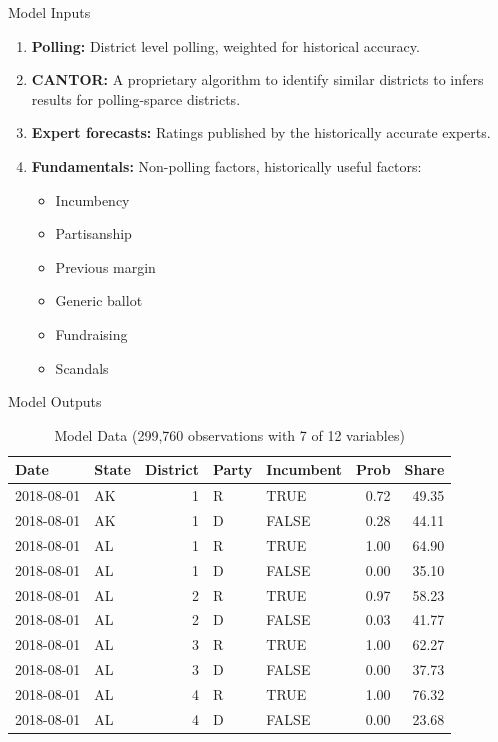 \documentclass[
  ignorenonframetext,
]{beamer}
\providecommand{\tightlist}{%
  \setlength{\itemsep}{0pt}\setlength{\parskip}{0pt}}
\begin{document}
\begin{frame}{Model Inputs}
\protect\hypertarget{model-inputs}{}

\begin{enumerate}
\tightlist
\item
  \textbf{Polling:} District level polling, weighted for historical
  accuracy.
\item
  \textbf{CANTOR:} A proprietary algorithm to identify similar districts
  to infers results for polling-sparce districts.
\item
  \textbf{Expert forecasts:} Ratings published by the historically
  accurate experts.
\item
  \textbf{Fundamentals:} Non-polling factors, historically useful
  factors:

  \begin{itemize}
  \tightlist
  \item
    Incumbency
  \item
    Partisanship
  \item
    Previous margin
  \item
    Generic ballot
  \item
    Fundraising
  \item
    Scandals
  \end{itemize}
\end{enumerate}

\end{frame}

\begin{frame}{Model Outputs}
\protect\hypertarget{model-outputs}{}

\begin{table}

\caption{\label{tab:model_data}Model Data (299,760 observations with 7 of 12 variables)}
\centering
\begin{tabular}[t]{l|l|r|l|l|r|r}
\hline
Date & State & District & Party & Incumbent & Prob & Share\\
\hline
2018-08-01 & AK & 1 & R & TRUE & 0.72 & 49.35\\
\hline
2018-08-01 & AK & 1 & D & FALSE & 0.28 & 44.11\\
\hline
2018-08-01 & AL & 1 & R & TRUE & 1.00 & 64.90\\
\hline
2018-08-01 & AL & 1 & D & FALSE & 0.00 & 35.10\\
\hline
2018-08-01 & AL & 2 & R & TRUE & 0.97 & 58.23\\
\hline
2018-08-01 & AL & 2 & D & FALSE & 0.03 & 41.77\\
\hline
2018-08-01 & AL & 3 & R & TRUE & 1.00 & 62.27\\
\hline
2018-08-01 & AL & 3 & D & FALSE & 0.00 & 37.73\\
\hline
2018-08-01 & AL & 4 & R & TRUE & 1.00 & 76.32\\
\hline
2018-08-01 & AL & 4 & D & FALSE & 0.00 & 23.68\\
\hline
\end{tabular}
\end{table}

\end{frame}
\end{document}
